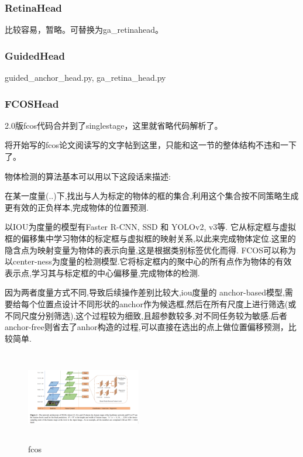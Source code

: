 \documentclass[UTF8]{ctexart}
\begin{document}
\subsubsection{RetinaHead}
比较容易，暂略。可替换为ga\_retinahead。
\subsubsection{GuidedHead}
guided\_anchor\_head.py, ga\_retina\_head.py

\subsubsection{FCOSHead}
2.0版fcos代码合并到了singlestage，这里就省略代码解析了。

将开始写的fcos论文阅读写的文字帖到这里，只能和这一节的整体结构不违和一下了。

物体检测的算法基本可以用以下这段话来描述:

在某一度量(..)下,找出与人为标定的物体的框的集合,利用这个集合按不同策略生成更有效的正负样本,完成物体的位置预测.

以IOU为度量的模型有Faster R-CNN, SSD 和 YOLOv2, v3等.
它从标定框与虚拟框的偏移集中学习物体的标定框与虚拟框的映射关系,以此来完成物体定位.这里的隐含点为映射变量为物体的表示向量,这是根据类别标签优化而得. FCOS可以称为以center-ness为度量的检测模型.它将标定框内的聚中心的所有点作为物体的有效表示点,学习其与标定框的中心偏移量,完成物体的检测.

因为两者度量方式不同,导致后续操作差别比较大,iou度量的
anchor-based模型,需要给每个位置点设计不同形状的anchor作为候选框,然后在所有尺度上进行筛选(或不同尺度分别筛选),这个过程较为细致,且超参数较多,对不同任务较为敏感.后者anchor-free则省去了anhor构造的过程,可以直接在选出的点上做位置偏移预测，比较简单.


\begin{figure}[htbp]
	\centering
	\begin{minipage}[t]{0.9\textwidth}
	\centering
	\includegraphics[width=5cm, height=4cm]{./pic/fcos_struct.png}
	\caption{fcos}
	\label{picfcos}
	\end{minipage}
\end{figure}
\end{document}
